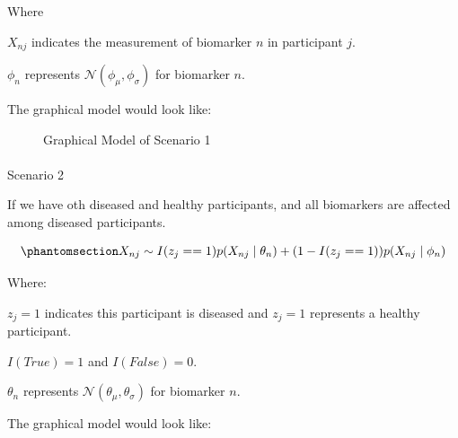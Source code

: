 \documentclass[
  letterpaper,
  DIV=11,
  numbers=noendperiod]{scrreprt}
\makeatletter
\let\oldparagraph\paragraph
\renewcommand{\paragraph}{
    \@ifstar
      \xxxParagraphStar
      \xxxParagraphNoStar
  }
\newcommand{\xxxParagraphStar}[1]{\oldparagraph*{#1}\mbox{}}
\newcommand{\xxxParagraphNoStar}[1]{\oldparagraph{#1}\mbox{}}
\makeatother
\begin{document}
Where

\(X_{nj}\) indicates the measurement of biomarker \(n\) in participant
\(j\).

\(\phi_{n}\) represents \(\mathcal N(\phi_{\mu}, \phi_{\sigma})\) for
biomarker \(n\).

The graphical model would look like:

\begin{figure}


\caption{\label{fig-g1}Graphical Model of Scenario 1}

\end{figure}%

\paragraph{Scenario 2}\label{scenario-2}

If we have oth diseased and healthy participants, and all biomarkers are
affected among diseased participants.

\begin{equation}\phantomsection\label{eq-gen-s2}{
X_{nj} \sim I(z_j == 1) p(X_{nj} \mid \theta_n) + (1-I(z_j == 1))p(X_{nj} \mid \phi_n)
}\end{equation}

Where:

\(z_j = 1\) indicates this participant is diseased and \(z_j = 1\)
represents a healthy participant.

\(I(True) = 1\) and \(I(False) = 0\).

\(\theta_{n}\) represents \(\mathcal N(\theta_{\mu}, \theta_{\sigma})\)
for biomarker \(n\).

The graphical model would look like:
\end{document}
